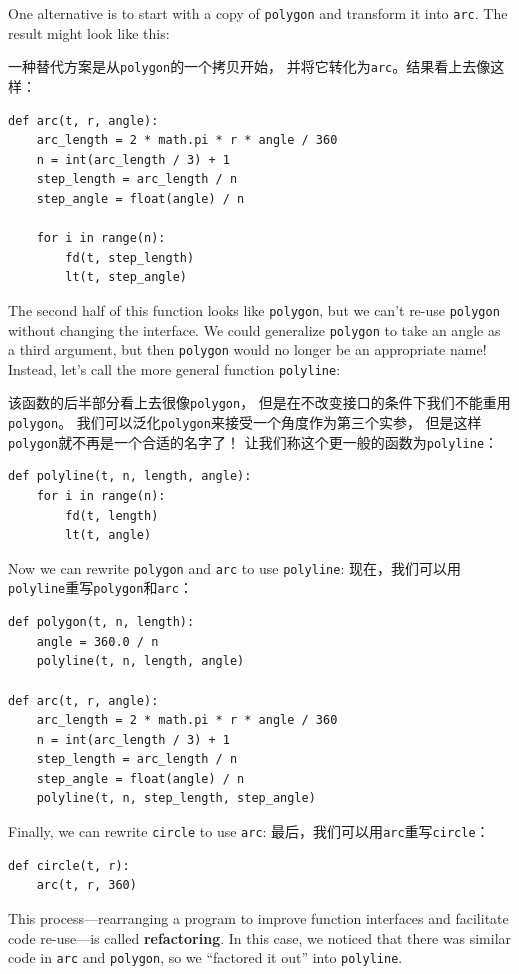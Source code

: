 \documentclass[10pt]{book}
\begin{document}
\begin{CJK}{UTF8}{gbsn}
One alternative is to start with a copy
of {\tt polygon} and transform it into {\tt arc}.  The result
might look like this:

一种替代方案是从{\tt polygon}的一个拷贝开始，
并将它转化为{\tt arc}。结果看上去像这样：

\begin{verbatim}
def arc(t, r, angle):
    arc_length = 2 * math.pi * r * angle / 360
    n = int(arc_length / 3) + 1
    step_length = arc_length / n
    step_angle = float(angle) / n
    
    for i in range(n):
        fd(t, step_length)
        lt(t, step_angle)
\end{verbatim}
%
The second half of this function looks like {\tt polygon}, but we
can't re-use {\tt polygon} without changing the interface.  We could
generalize {\tt polygon} to take an angle as a third argument,
but then {\tt polygon} would no longer be an appropriate name!
Instead, let's call the more general function {\tt polyline}:

该函数的后半部分看上去很像{\tt polygon}，
但是在不改变接口的条件下我们不能重用{\tt polygon}。
我们可以泛化{\tt polygon}来接受一个角度作为第三个实参，
但是这样{\tt polygon}就不再是一个合适的名字了！
让我们称这个更一般的函数为{\tt polyline}：

\begin{verbatim}
def polyline(t, n, length, angle):
    for i in range(n):
        fd(t, length)
        lt(t, angle)
\end{verbatim}
%
Now we can rewrite {\tt polygon} and {\tt arc} to use {\tt polyline}:
现在，我们可以用{\tt polyline}重写{\tt polygon}和{\tt arc}：

\begin{verbatim}
def polygon(t, n, length):
    angle = 360.0 / n
    polyline(t, n, length, angle)

def arc(t, r, angle):
    arc_length = 2 * math.pi * r * angle / 360
    n = int(arc_length / 3) + 1
    step_length = arc_length / n
    step_angle = float(angle) / n
    polyline(t, n, step_length, step_angle)
\end{verbatim}
%
Finally, we can rewrite {\tt circle} to use {\tt arc}:
最后，我们可以用{\tt arc}重写{\tt circle}：

\begin{verbatim}
def circle(t, r):
    arc(t, r, 360)
\end{verbatim}
%
This process---rearranging a program to improve function
interfaces and facilitate code re-use---is called {\bf refactoring}.
In this case, we noticed that there was similar code in {\tt arc} and
{\tt polygon}, so we ``factored it out'' into {\tt polyline}.


\end{CJK}
\end{document}
